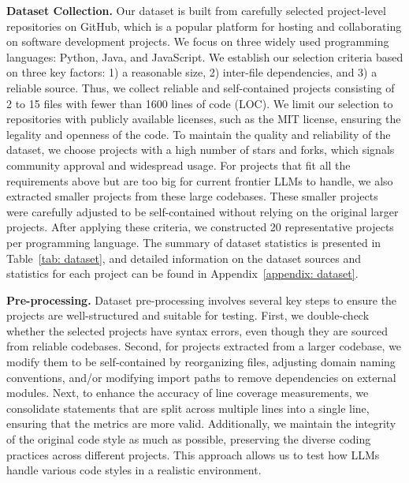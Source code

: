 \textbf{Dataset Collection. }
Our dataset is built from carefully selected project-level repositories on GitHub, which is a popular platform for hosting and collaborating on software development projects. We focus on three widely used programming languages: Python, Java, and JavaScript. We establish our selection criteria based on three key factors: 1) a reasonable size, 2) inter-file dependencies, and 3) a reliable source. Thus, we collect reliable and self-contained projects consisting of 2 to 15 files with fewer than 1600 lines of code (LOC).
We limit our selection to repositories with publicly available licenses, such as the MIT license, ensuring the legality and openness of the code. 
To maintain the quality and reliability of the dataset, we choose projects with a high number of stars and forks, which signals community approval and widespread usage. 
For projects that fit all the requirements above but are too big for current frontier LLMs to handle, we also extracted smaller projects from these large codebases. These smaller projects were carefully adjusted to be self-contained without relying on the original larger projects.
After applying these criteria, we constructed 20 representative projects per programming language. 
The summary of dataset statistics is presented in Table~\ref{tab: dataset}, and detailed information on the dataset sources and statistics for each project can be found in Appendix~\ref{appendix: dataset}.



\noindent\textbf{Pre-processing. }
Dataset pre-processing involves several key steps to ensure the projects are well-structured and suitable for testing. 
First, we double-check whether the selected projects have syntax errors, even though they are sourced from reliable codebases.
Second, for projects extracted from a larger codebase, we modify them to be self-contained by reorganizing files, adjusting domain naming conventions, and/or modifying import paths to remove dependencies on external modules.
Next, to enhance the accuracy of line coverage measurements, we consolidate statements that are split across multiple lines into a single line, ensuring that the metrics are more valid. 
Additionally, we maintain the integrity of the original code style as much as possible, preserving the diverse coding practices across different projects. This approach allows us to test how LLMs handle various code styles in a realistic environment.

